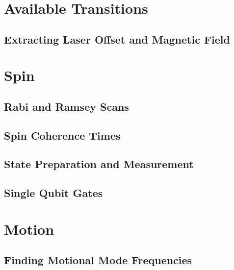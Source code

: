 \documentclass[12pt]{report}
\begin{document}
\section{Available Transitions}
\label{sec:Transitions}
\subsection{Extracting Laser Offset and Magnetic Field}

\section{Spin}
\label{sec:Spin}

\subsection{Rabi and Ramsey Scans}

\subsection{Spin Coherence Times}

\subsection{State Preparation and Measurement}

\subsection{Single Qubit Gates}


\section{Motion}
\label{sec:Motion}

\subsection{Finding Motional Mode Frequencies}
\end{document}
